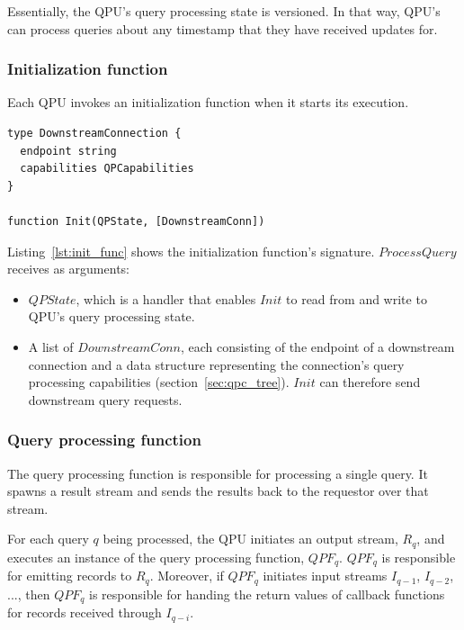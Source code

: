 Essentially, the QPU's query processing state is versioned.
In that way, QPU's can process queries about any timestamp that they have received updates for.


\subsubsection{Initialization function}
\label{sec:initialization_func}

Each QPU invokes an initialization function when it starts its execution.

\todo{}
\begin{lstlisting}[caption={Initialization function signature},captionpos=b,label={lst:init_func}]
type DownstreamConnection {
  endpoint string
  capabilities QPCapabilities
}

function Init(QPState, [DownstreamConn])
\end{lstlisting}

\noindent
Listing~\ref{lst:init_func} shows the initialization function's signature.
$ProcessQuery$ receives as arguments:
\begin{itemize}
  \item $QPState$, which is a handler that enables $Init$ to read from and write to QPU's query processing state.

  \item A list of $DownstreamConn$, each consisting of the endpoint of a downstream connection and a data structure
  representing the connection's query processing capabilities (section~\ref{sec:qpc_tree}).
  $Init$ can therefore send downstream query requests.
\end{itemize}


\subsubsection{Query processing function}
\label{sec:query_processing_func}

The query processing function is responsible for processing a single query.
It spawns a result stream and sends the results back to the requestor over that stream.

For each query $q$ being processed, the QPU initiates an output stream, $R_q$,
and executes an instance of the query processing function, $QPF_q$.
$QPF_q$ is responsible for emitting records to $R_q$.
Moreover, if $QPF_q$ initiates input streams $I_{q-1}$, $I_{q-2}$, ..., then $QPF_q$ is responsible for handing the return
values of callback functions for records received through $I_{q-i}$.

